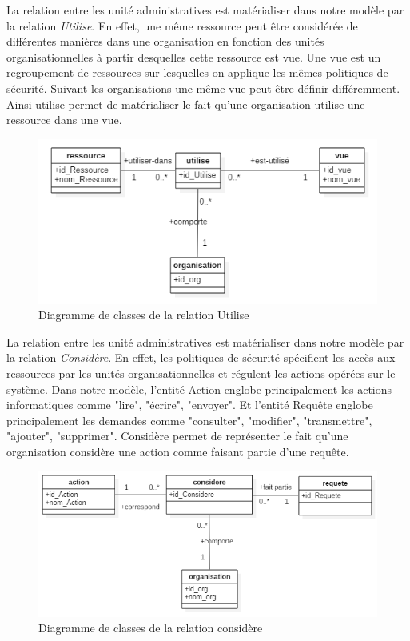 \label{sectionRessourceetVue}

La relation entre les unité administratives est matérialiser dans  notre modèle par la relation \textit{Utilise}. En effet, une même ressource peut être considérée de différentes manières dans une organisation en fonction des unités organisationnelles à partir desquelles cette ressource est vue. Une vue est un regroupement de ressources sur lesquelles on applique les mêmes politiques de sécurité. Suivant les organisations une même vue peut être définir différemment. Ainsi utilise permet de matérialiser le fait qu'une organisation utilise une ressource dans une vue.

\begin{figure}[h!]
    \centering
		\includegraphics[scale=0.7]{chap3/images/utilise.png}
    \caption{Diagramme de classes de la relation Utilise}
	 \label{figutilise}
\end{figure} 

\label{sectionActionRequêtes}

La relation entre les unité administratives est matérialiser dans  notre modèle par la relation \textit{Considère}. En effet, les politiques de sécurité spécifient les accès aux ressources par les unités organisationnelles et régulent les actions opérées sur le système. Dans notre modèle, l'entité Action englobe principalement les actions informatiques comme "lire", "écrire", "envoyer". Et l'entité Requête englobe principalement les demandes comme "consulter", "modifier", "transmettre", "ajouter", "supprimer". Considère permet de représenter le fait qu'une  organisation considère une action comme faisant partie d'une requête.

\begin{figure}[h!]
    \centering
		\includegraphics[scale=0.7]{chap3/images/considere.png}
    \caption{Diagramme de classes de la relation considère}
	 \label{figconsidere}
\end{figure} 

